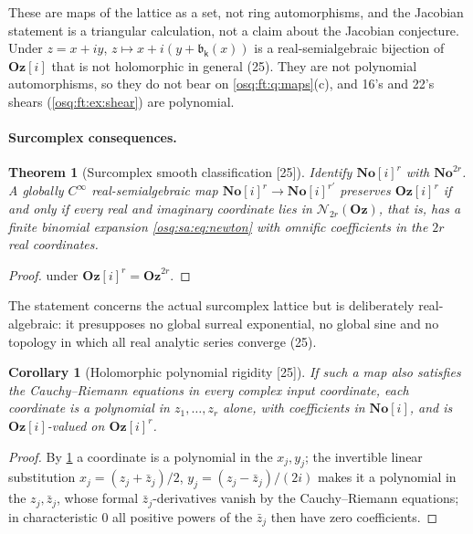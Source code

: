 \documentclass[11pt,letterpaper]{article}
\numberwithin{equation}{section}
\newtheorem{theorem}{Theorem}[section]
\newtheorem{corollary}[corollary]{Corollary}
\theoremstyle{definition}
\theoremstyle{remark}
\theoremstyle{plain}
\newcommand{\No}{\mathbf{No}}
\newcommand{\Oz}{\mathbf{Oz}}
\newcommand{\SC}{\No[i]}
\newcommand{\GOz}{\Oz[i]}
\newcommand{\Num}{\mathscr N}
\newcommand{\src}[1]{\textup{\textsf{[#1]}}}
\begin{document}
These are maps of the lattice as a set, not ring automorphisms, and the Jacobian statement is a triangular calculation, not a claim about the Jacobian
conjecture. Under $z=x+iy$, $z\mapsto x+i(y+\mathfrak b_{\mathsf k}(x))$ is a real-semialgebraic bijection of $\GOz$ that is not holomorphic in general
(25). They are not polynomial automorphisms, so they do not bear on \cref{osq:ft:q:maps}(c), and 16's and 22's shears (\cref{osq:ft:ex:shear}) are
polynomial.

\paragraph{Surcomplex consequences.}

\begin{theorem}[Surcomplex smooth classification \src{25}]\label{osq:sa:thm:complexreal}
Identify $\SC^r$ with $\No^{2r}$. A globally $C^\infty$ real-semialgebraic map $\SC^r\to\SC^{r'}$ preserves $\GOz^r$ if and only if every real and
imaginary coordinate lies in $\Num_{2r}(\Oz)$, that is, has a finite binomial expansion \eqref{osq:sa:eq:newton} with omnific coefficients in the $2r$ real
coordinates.
\end{theorem}
\begin{proof}
 under $\GOz^r=\Oz^{2r}$.
\end{proof}

The statement concerns the actual surcomplex lattice but is deliberately real-algebraic: it presupposes no global surreal exponential, no global sine and
no topology in which all real analytic series converge (25).

\begin{corollary}[Holomorphic polynomial rigidity \src{25}]\label{osq:sa:cor:holomorphic}
If such a map also satisfies the Cauchy--Riemann equations in every complex input coordinate, each coordinate is a polynomial in $z_1,\dots,z_r$ alone,
with coefficients in $\SC$, and is $\GOz$-valued on $\GOz^r$.
\end{corollary}
\begin{proof}
By \cref{osq:sa:thm:complexreal} a coordinate is a polynomial in the $x_j,y_j$; the invertible linear substitution $x_j=(z_j+\bar z_j)/2$,
$y_j=(z_j-\bar z_j)/(2i)$ makes it a polynomial in the $z_j,\bar z_j$, whose formal $\bar z_j$-derivatives vanish by the Cauchy--Riemann equations; in
characteristic $0$ all positive powers of the $\bar z_j$ then have zero coefficients.
\end{proof}
\end{document}
